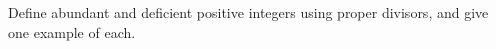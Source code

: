 Define abundant and deficient positive integers using proper divisors, and give one example of each.
